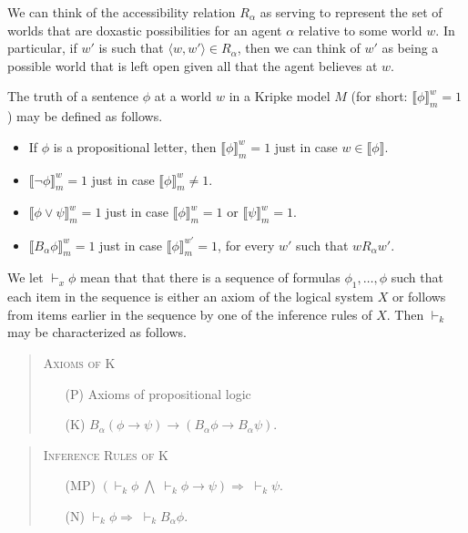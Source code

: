 We can think of the accessibility relation $R_\alpha$ as serving to represent the set of worlds that are doxastic possibilities for an agent $\alpha$ relative to some world $w$.
In particular, if $w'$ is such that $\langle w, w' \rangle \in R_\alpha$, then we can think of $w'$ as being a possible world that is left open given all that the agent believes at $w$.

The truth of a sentence $\phi$ at a world $w$ in a Kripke model $M$ (for short: $\llbracket \phi \rrbracket^w_m = 1$) may be defined as follows.

\begin{itemize}
\item If $\phi$ is a propositional letter, then $\llbracket \phi \rrbracket^w_m = 1$ just in case $ w \in \llbracket \phi \rrbracket $.
\item $\llbracket \lnot \phi \rrbracket^w_m = 1$ just in case $\llbracket \phi \rrbracket^w_m \neq 1$.
\item $\llbracket \phi \vee \psi \rrbracket^w_m = 1$ just in case $\llbracket \phi \rrbracket^w_m = 1$ or $\llbracket \psi \rrbracket^w_m = 1$.
\item $\llbracket B_\alpha \phi \rrbracket^w_m = 1$ just in case $\llbracket \phi \rrbracket^{w'}_m = 1$, for every $w'$ such that $w R_\alpha w'$.
\end{itemize}

We let $\vdash_x \phi$ mean that that there is a sequence of formulas $\phi_1,\ldots,\phi$ such that each item in the sequence is either an axiom of the logical system $X$ or follows from items earlier in the sequence by one of the inference rules of $X$.
Then $\vdash_k$ may be characterized as follows.

\begin{quote}
\textsc{Axioms of K}
\begin{itemize}
\item[(P)]\quad Axioms of propositional logic
\item[(K)]\quad $B_\alpha(\phi \rightarrow \psi) \rightarrow (B_\alpha \phi \rightarrow B_\alpha \psi)$.
\end{itemize}
\end{quote}

\begin{quote}
\textsc{Inference Rules of K}
\begin{itemize}
\item[(MP)]\quad $\left(\vdash_k \phi \; \bigwedge \; \vdash_k \phi \rightarrow \psi\right)  \Rightarrow \; \vdash_k \psi$.
\item[(N)]\quad $\vdash_k \phi \Rightarrow \; \vdash_k B_\alpha \phi$.
\end{itemize}
\end{quote}

